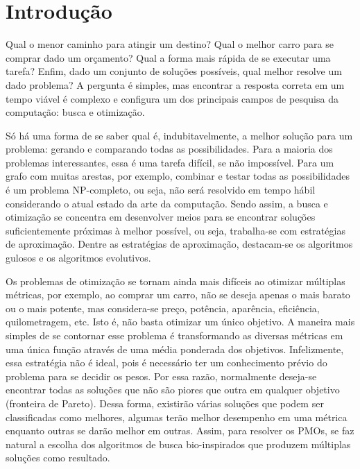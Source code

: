 \chapter[Introdução]{Introdução}

Qual o menor caminho para atingir um destino? Qual o melhor carro para se comprar dado um orçamento? Qual a forma mais rápida de se executar uma tarefa? Enfim, dado um conjunto de soluções possíveis, qual melhor resolve um dado problema? A pergunta é simples, mas encontrar a resposta correta em um tempo viável é complexo e configura um dos principais campos de pesquisa da computação: busca e otimização.

Só há uma forma de se saber qual é, indubitavelmente, a melhor solução para um problema: gerando e comparando todas as possibilidades. Para a maioria dos problemas interessantes, essa é uma tarefa difícil, se não impossível. Para um grafo com muitas arestas, por exemplo, combinar e testar todas as possibilidades é um problema NP-completo, ou seja, não será resolvido em tempo hábil considerando o atual estado da arte da computação. Sendo assim, a busca e otimização se concentra em desenvolver meios para se encontrar soluções suficientemente próximas à melhor possível, ou seja, trabalha-se com estratégias de aproximação. Dentre as estratégias de aproximação, destacam-se os algoritmos gulosos e os algoritmos evolutivos.

Os problemas de otimização se tornam ainda mais difíceis ao otimizar múltiplas métricas, por exemplo, ao comprar um carro, não se deseja apenas o mais barato ou o mais potente, mas considera-se preço, potência, aparência, eficiência, quilometragem, etc. Isto é, não basta otimizar um único objetivo. A maneira mais simples de se contornar esse problema é transformando as diversas métricas em uma única função através de uma média ponderada dos objetivos. Infelizmente, essa estratégia não é ideal, pois é necessário ter um conhecimento prévio do problema para se decidir os pesos. Por essa razão, normalmente deseja-se encontrar todas as soluções que não são piores que outra em qualquer objetivo (fronteira de Pareto). Dessa forma, existirão várias soluções que podem ser classificadas como melhores, algumas terão melhor desempenho em uma métrica enquanto outras se darão melhor em outras. Assim, para resolver os \acp{PMO}, se faz natural a escolha dos algoritmos de busca bio-inspirados que produzem múltiplas soluções como resultado.


